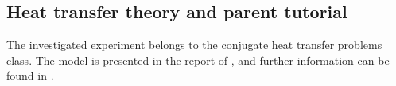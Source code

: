 \subsection{Heat transfer theory and parent tutorial}
\label{subsection:heattransfertheorytutorial}

The investigated experiment belongs to the conjugate heat transfer
problems class.
The model is presented in the report of \textcite{ReportTempel},
and further information can be found in \textcite{OFWikicht}.
